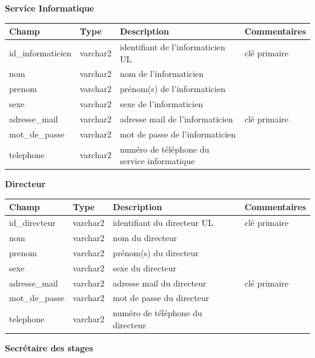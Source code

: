 \documentclass{scrreprt}
\begin{document}
\begin{center}
\vspace {1cm}
\textbf 
{Service Informatique}
\vspace {0,5cm}

\begin{tabular}{|p{}|p{2cm}|p{7cm}|p{}|}
  \hline
  \textbf {Champ} & \textbf {Type} & \textbf {Description} & \textbf {Commentaires} \\
  \hline
  id_informaticien & varchar2 & identifiant de l'informaticien UL & clé primaire\\
  \hline
  nom & varchar2 & nom de l'informaticien & \\
  \hline
  prenom & varchar2 & prénom(s) de l'informaticien &  \\
  \hline
  sexe & varchar2 & sexe de l'informaticien &  \\
  \hline
  adresse_mail & varchar2 & adresse mail de l'informaticien & clé primaire  \\
  \hline
  mot_de_passe & varchar2 & mot de passe de l'informaticien &  \\
  \hline
  telephone & varchar2 & numéro de téléphone du service informatique &  \\
  \hline
\end{tabular}

\vspace {2cm}
\textbf 
{Directeur}
\vspace {0,5cm}

\begin{tabular}{|p{}|p{2cm}|p{7cm}|p{}|}
  \hline
  \textbf {Champ} & \textbf {Type} & \textbf {Description} & \textbf {Commentaires} \\
  \hline
  id_directeur & varchar2 & identifiant du directeur UL & clé primaire\\
  \hline
  nom & varchar2 & nom du directeur & \\
  \hline
  prenom & varchar2 & prénom(s) du directeur &  \\
  \hline
  sexe & varchar2 & sexe du directeur &  \\
  \hline
  adresse_mail & varchar2 & adresse mail du directeur & clé primaire  \\
  \hline
  mot_de_passe & varchar2 & mot de passe du directeur &  \\
  \hline
  telephone & varchar2 & numéro de téléphone du directeur &  \\
  \hline
\end{tabular}

\vspace {1cm}
\textbf 
{Secrétaire des stages}
\vspace {0,5cm}


\end{center}
\end{document}
